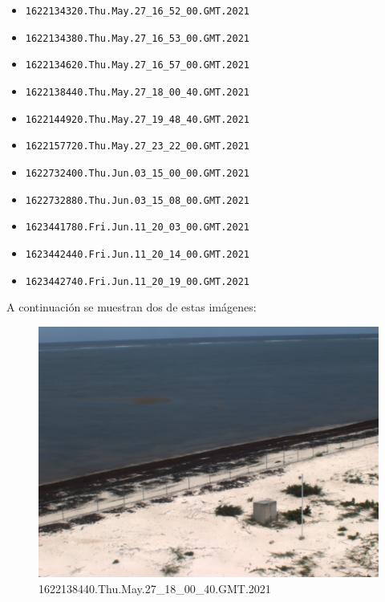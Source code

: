 \documentclass[conference]{IEEEtran}
\begin{document}
\begin{itemize}
    \item \verb|1622134320.Thu.May.27_16_52_00.GMT.2021|
    \item \verb|1622134380.Thu.May.27_16_53_00.GMT.2021|
    \item \verb|1622134620.Thu.May.27_16_57_00.GMT.2021|
    \item \verb|1622138440.Thu.May.27_18_00_40.GMT.2021|
    \item \verb|1622144920.Thu.May.27_19_48_40.GMT.2021|
    \item \verb|1622157720.Thu.May.27_23_22_00.GMT.2021|
    \item \verb|1622732400.Thu.Jun.03_15_00_00.GMT.2021|
    \item \verb|1622732880.Thu.Jun.03_15_08_00.GMT.2021|
    \item \verb|1623441780.Fri.Jun.11_20_03_00.GMT.2021|
    \item \verb|1623442440.Fri.Jun.11_20_14_00.GMT.2021|
    \item \verb|1623442740.Fri.Jun.11_20_19_00.GMT.2021|
\end{itemize}

A continuación se muestran dos de estas imágenes:

\begin{figure}[H]
    \centering
    \includegraphics[scale=0.13]{imgs/selected_img_2.png}
    \caption{1622138440.Thu.May.27\_18\_00\_40.GMT.2021}
\end{figure}
\end{document}
